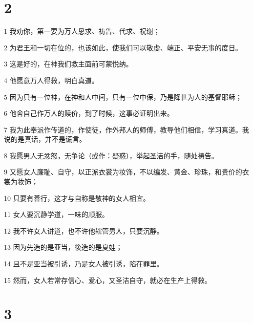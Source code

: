 \chapter{2}

\par 1 我劝你，第一要为万人恳求、祷告、代求、祝谢；
\par 2 为君王和一切在位的，也该如此，使我们可以敬虔、端正、平安无事的度日。
\par 3 这是好的，在神我们救主面前可蒙悦纳。
\par 4 他愿意万人得救，明白真道。
\par 5 因为只有一位神，在神和人中间，只有一位中保，乃是降世为人的基督耶稣；
\par 6 他舍自己作万人的赎价，到了时候，这事必证明出来。
\par 7 我为此奉派作传道的，作使徒，作外邦人的师傅，教导他们相信，学习真道。我说的是真话，并不是谎言。
\par 8 我愿男人无忿怒，无争论（或作：疑惑），举起圣洁的手，随处祷告。
\par 9 又愿女人廉耻、自守，以正派衣裳为妆饰，不以编发、黄金、珍珠，和贵价的衣裳为妆饰；
\par 10 只要有善行，这才与自称是敬神的女人相宜。
\par 11 女人要沉静学道，一味的顺服。
\par 12 我不许女人讲道，也不许他辖管男人，只要沉静。
\par 13 因为先造的是亚当，後造的是夏娃；
\par 14 且不是亚当被引诱，乃是女人被引诱，陷在罪里。
\par 15 然而，女人若常存信心、爱心，又圣洁自守，就必在生产上得救。

\chapter{3}

